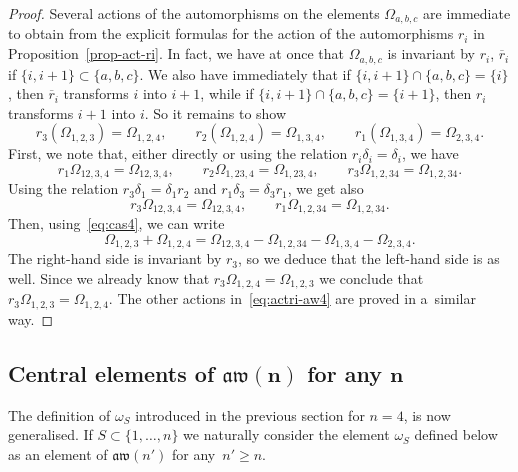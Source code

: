 \documentclass[10pt,a4paper]{amsart}
\numberwithin{equation}{section}
\theoremstyle{definition}
\newcommand{\rb}{\overline{r}}
\begin{document}
\begin{proof}
Several actions of the automorphisms on the elements $\varOmega_{a,b,c}$ are immediate to obtain from the explicit formulas for the action of the automorphisms $r_i$ in Proposition~\ref{prop-act-ri}. In fact, we have at once that $\varOmega_{a,b,c}$ is invariant by $r_i$, $\rb_i$ if $\{i,i+1\}\subset\{a,b,c\}$. We also have immediately that if $\{i,i+1\}\cap\{a,b,c\}=\{i\}$, then $\rb_i$ transforms $i$ into $i+1$, while if $\{i,i+1\}\cap\{a,b,c\}=\{i+1\}$, then $r_i$ transforms $i+1$ into $i$. So it remains to show
\begin{equation}\label{eq:actri-aw4}
r_3(\varOmega_{1,2,3})=\varOmega_{1,2,4} ,\qquad r_2(\varOmega_{1,2,4})=\varOmega_{1,3,4} ,\qquad r_1(\varOmega_{1,3,4})=\varOmega_{2,3,4} .
\end{equation}
First, we note that, either directly or using the relation $r_i\delta_i=\delta_i$, we have
\[r_1\varOmega_{12,3,4}=\varOmega_{12,3,4} ,\qquad r_2\varOmega_{1,23,4}=\varOmega_{1,23,4} ,\qquad r_3\varOmega_{1,2,34}=\varOmega_{1,2,34} .\]
Using the relation $r_3\delta_1=\delta_1r_2$ and $r_1\delta_3=\delta_3r_1$, we get also
\[r_3\varOmega_{12,3,4}=\varOmega_{12,3,4} ,\qquad r_1\varOmega_{1,2,34}=\varOmega_{1,2,34} .\]
Then, using~\eqref{eq:cas4}, we can write
\[\varOmega_{1,2,3}+\varOmega_{1,2,4}=\varOmega_{12,3,4}-\varOmega_{1,2,34}-\varOmega_{1,3,4}-\varOmega_{2,3,4} .\]
The right-hand side is invariant by $r_3$, so we deduce that the left-hand side is as well. Since we already know that $r_3\varOmega_{1,2,4}=\varOmega_{1,2,3}$ we conclude that $r_3\varOmega_{1,2,3}=\varOmega_{1,2,4}$. The other actions in~\eqref{eq:actri-aw4} are proved in a~similar way.
\end{proof}

\subsection[Central elements of aw(n) for any n]{Central elements of $\boldsymbol{\mathfrak{aw}(n)}$ for any $\boldsymbol{n}$}
The definition of $\omega_S$ introduced in the previous section for $n=4$, is now generalised. If ${S\subset\{1,\dots,n\}}$ we naturally consider the element $\omega_S$ defined below as an element of $\mathfrak{aw}(n')$ for any~$n'\geq n$.
\end{document}
